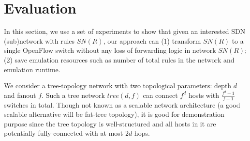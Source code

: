 \section{Evaluation}
In this section, we use a set of experiments to show that
given an interested SDN (sub)network with rules $SN(R)$, our approach can 
(1) transform $SN(R)$ to a single OpenFlow switch without any loss of forwarding logic in network $SN(R)$;
(2) save emulation resources such as number of total rules in the network and emulation runtime.

We consider a tree-topology network with two topological parameters: depth $d$ and fanout $f$.
Such a tree network $tree(d, f)$ can connect $f^d$ hosts with $\frac{f^d - 1}{f-1}$ switches in total.
Though not known as a scalable network architecture
(a good scalable alternative will be fat-tree topology),
it is good for demonstration purpose since the tree topology is well-structured and
all hosts in it are potentially fully-connected with at most $2d$ hops.


